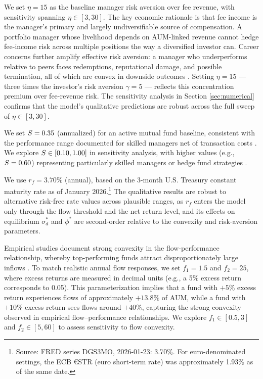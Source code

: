 We set \(\eta=15\) as the baseline manager risk aversion over fee
revenue, with sensitivity spanning \(\eta\in[3,30]\). The key economic
rationale is that fee income is the manager's primary and largely
undiversifiable source of compensation. A portfolio manager whose
livelihood depends on AUM-linked revenue cannot hedge fee-income risk
across multiple positions the way a diversified investor can. Career
concerns further amplify effective risk aversion: a manager who
underperforms relative to peers faces redemptions, reputational damage,
and possible termination, all of which are convex in downside outcomes
\citep[][]{chevalier1997risk, BrownHarlowStarks1996}. Setting
\(\eta=15\) --- three times the investor's risk aversion \(\gamma=5\)
--- reflects this concentration premium over fee-revenue risk. The
sensitivity analysis in Section \ref{sec:numerical} confirms that the
model's qualitative predictions are robust across the full sweep of
\(\eta\in[3,30]\).

We set \(S=0.35\) (annualized) for an active mutual fund baseline,
consistent with the performance range documented for skilled managers
net of transaction costs \citep[][]{carhart1997persistence}. We explore
\(S\in[0.10,1.00]\) in sensitivity analysis, with higher values
(e.g., \(S=0.60\)) representing particularly skilled managers or
hedge fund strategies \citep[][]{fung2004hedge}.

We use \(r_f=3.70\%\) (annual), based on the 3-month U.S. Treasury
constant maturity rate as of January 2026.\footnote{Source: FRED series
  DGS3MO, 2026-01-23: 3.70\%. For euro-denominated settings, the ECB
  €STR (euro short-term rate) was approximately 1.93\% as of the same
  date.} The qualitative results are robust to alternative risk-free
rate values across plausible ranges, as \(r_f\) enters the model only
through the flow threshold and the net return level, and its effects on
equilibrium \(\sigma_d^*\) and \(\phi^*\) are second-order relative to
the convexity and risk-aversion parameters.

Empirical studies document strong convexity in the flow-performance
relationship, whereby top-performing funds attract disproportionately
large inflows \citep[][]{sirri1998costly, ferreira2012flow}. To match
realistic annual flow responses, we set \(f_1=1.5\) and \(f_2=25\),
where excess returns are measured in decimal units (e.g., a 5\% excess
return corresponds to 0.05). This parameterization implies that a fund
with \(+5\%\) excess return experiences flows of approximately
\(+13.8\%\) of AUM, while a fund with \(+10\%\) excess return sees flows
around \(+40\%\), capturing the strong convexity observed in empirical
flow--performance relationships. We explore \(f_1\in[0.5,3]\) and
\(f_2\in[5,60]\) to assess sensitivity to flow convexity.

